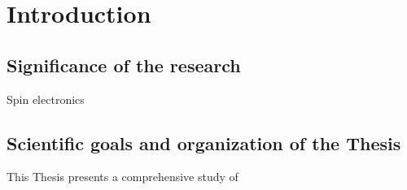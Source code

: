 \chapter{Introduction}\label{intro}

\section{Significance of the research}\label{intro:impact}

\indent Spin electronics 


\section{Scientific goals and organization of the Thesis}\label{intro:goal}

This Thesis presents a comprehensive study of 


\cleardoublepage
